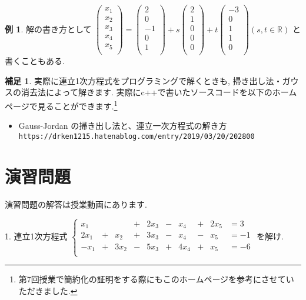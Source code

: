 \documentclass[dvipdfmx,a4paper,11pt]{article}
\newcommand{\R}{\mathbb{R}}
\theoremstyle{definition}
\newtheorem{exa}[thm]{例}
\newtheorem{rema}[thm]{補足}
\begin{document}
\begin{exa}
解の書き方として
$
\begin{pmatrix}
x_1\\
x_2 \\
x_3 \\
x_4 \\
x_5 \\
\end{pmatrix}
=
\begin{pmatrix}
2\\
0 \\
-1 \\
0\\
1 \\
\end{pmatrix}
+ s
\begin{pmatrix}
2\\
1\\
0\\
0\\
0 \\
\end{pmatrix}
+ t
\begin{pmatrix}
-3\\
0\\
1\\
1\\
0 \\
\end{pmatrix}
(s, t \in \R)
$
と書くこともある.

 \end{exa}

\begin{rema}
実際に連立1次方程式をプログラミングで解くときも, 掃き出し法・ガウスの消去法によって解きます. 実際にc++で書いたソースコードを以下のホームページで見ることができます.\footnote{第7回授業で簡約化の証明をする際にもこのホームページを参考にさせていただきました.}
\begin{itemize}
\item Gauss-Jordan の掃き出し法と、連立一次方程式の解き方 \\
 \texttt{https://drken1215.hatenablog.com/entry/2019/03/20/202800}
\end{itemize}
\end{rema}

\section{演習問題}
演習問題の解答は授業動画にあります.

1.
連立1次方程式
 $
 \left\{ 
\begin{matrix}
x_1& &         &  +& 2x_3&- &x_4&+ & 2x_5&= 3 \\
2x_1&+&x_2& + &3x_3&-&x_4&-&x_5&= -1 \\
-x_1&+&3x_2& - &5x_3&+&4x_4&+&x_5&= -6 \\
\end{matrix}
\right.
 $
 を解け.
\end{document}
